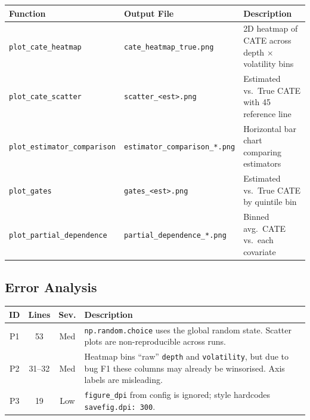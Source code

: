 \documentclass[11pt, letterpaper]{article}
\begin{document}
\begin{center}
\begin{tabularx}{\textwidth}{l l X}
    \toprule
    \textbf{Function} & \textbf{Output File} & \textbf{Description} \\
    \midrule
    \texttt{plot\_cate\_heatmap}     & \texttt{cate\_heatmap\_true.png} & 2D heatmap of CATE across depth $\times$ volatility bins \\
    \texttt{plot\_cate\_scatter}     & \texttt{scatter\_<est>.png}      & Estimated vs.\ True CATE with 45\textdegree{} reference line \\
    \texttt{plot\_estimator\_comparison} & \texttt{estimator\_comparison\_*.png} & Horizontal bar chart comparing estimators \\
    \texttt{plot\_gates}            & \texttt{gates\_<est>.png}        & Estimated vs.\ True CATE by quintile bin \\
    \texttt{plot\_partial\_dependence} & \texttt{partial\_dependence\_*.png} & Binned avg.\ CATE vs.\ each covariate \\
    \bottomrule
\end{tabularx}
\end{center}

\subsection{Error Analysis}

\begin{center}
\begin{tabularx}{\textwidth}{c c c X}
    \toprule
    \textbf{ID} & \textbf{Lines} & \textbf{Sev.} & \textbf{Description} \\
    \midrule
    P1 & 53 & \textcolor{medsev}{Med} &
        \texttt{np.random.choice} uses the global random state. Scatter plots are non-reproducible across runs. \\[6pt]
    P2 & 31--32 & \textcolor{medsev}{Med} &
        Heatmap bins ``raw'' \texttt{depth} and \texttt{volatility}, but due to bug F1 these columns may already be winsorised. Axis labels are misleading. \\[6pt]
    P3 & 19 & \textcolor{lowsev}{Low} &
        \texttt{figure\_dpi} from config is ignored; style hardcodes \texttt{savefig.dpi: 300}. \\
    \bottomrule
\end{tabularx}
\end{center}


\newpage
\end{document}
